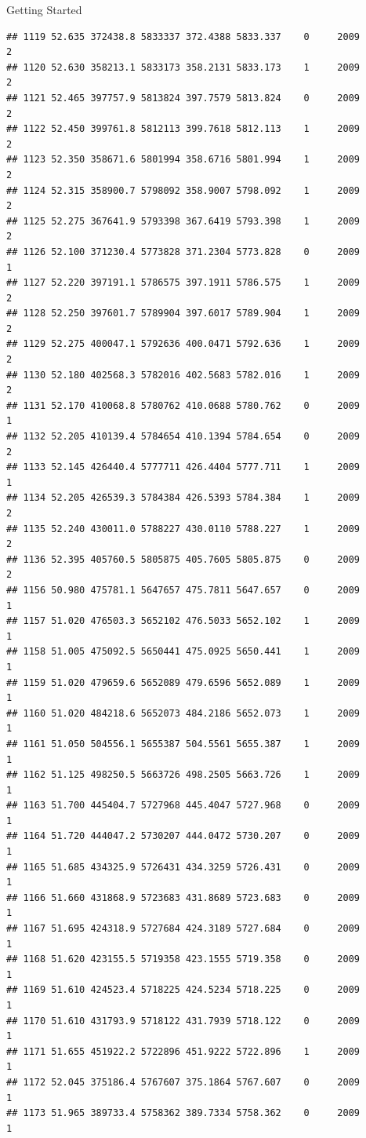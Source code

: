 \documentclass[
  ignorenonframetext,
]{beamer}
\begin{document}
\begin{frame}[fragile]{Getting Started}
\begin{verbatim}
## 1119 52.635 372438.8 5833337 372.4388 5833.337    0     2009        2
## 1120 52.630 358213.1 5833173 358.2131 5833.173    1     2009        2
## 1121 52.465 397757.9 5813824 397.7579 5813.824    0     2009        2
## 1122 52.450 399761.8 5812113 399.7618 5812.113    1     2009        2
## 1123 52.350 358671.6 5801994 358.6716 5801.994    1     2009        2
## 1124 52.315 358900.7 5798092 358.9007 5798.092    1     2009        2
## 1125 52.275 367641.9 5793398 367.6419 5793.398    1     2009        2
## 1126 52.100 371230.4 5773828 371.2304 5773.828    0     2009        1
## 1127 52.220 397191.1 5786575 397.1911 5786.575    1     2009        2
## 1128 52.250 397601.7 5789904 397.6017 5789.904    1     2009        2
## 1129 52.275 400047.1 5792636 400.0471 5792.636    1     2009        2
## 1130 52.180 402568.3 5782016 402.5683 5782.016    1     2009        2
## 1131 52.170 410068.8 5780762 410.0688 5780.762    0     2009        1
## 1132 52.205 410139.4 5784654 410.1394 5784.654    0     2009        2
## 1133 52.145 426440.4 5777711 426.4404 5777.711    1     2009        1
## 1134 52.205 426539.3 5784384 426.5393 5784.384    1     2009        2
## 1135 52.240 430011.0 5788227 430.0110 5788.227    1     2009        2
## 1136 52.395 405760.5 5805875 405.7605 5805.875    0     2009        2
## 1156 50.980 475781.1 5647657 475.7811 5647.657    0     2009        1
## 1157 51.020 476503.3 5652102 476.5033 5652.102    1     2009        1
## 1158 51.005 475092.5 5650441 475.0925 5650.441    1     2009        1
## 1159 51.020 479659.6 5652089 479.6596 5652.089    1     2009        1
## 1160 51.020 484218.6 5652073 484.2186 5652.073    1     2009        1
## 1161 51.050 504556.1 5655387 504.5561 5655.387    1     2009        1
## 1162 51.125 498250.5 5663726 498.2505 5663.726    1     2009        1
## 1163 51.700 445404.7 5727968 445.4047 5727.968    0     2009        1
## 1164 51.720 444047.2 5730207 444.0472 5730.207    0     2009        1
## 1165 51.685 434325.9 5726431 434.3259 5726.431    0     2009        1
## 1166 51.660 431868.9 5723683 431.8689 5723.683    0     2009        1
## 1167 51.695 424318.9 5727684 424.3189 5727.684    0     2009        1
## 1168 51.620 423155.5 5719358 423.1555 5719.358    0     2009        1
## 1169 51.610 424523.4 5718225 424.5234 5718.225    0     2009        1
## 1170 51.610 431793.9 5718122 431.7939 5718.122    0     2009        1
## 1171 51.655 451922.2 5722896 451.9222 5722.896    1     2009        1
## 1172 52.045 375186.4 5767607 375.1864 5767.607    0     2009        1
## 1173 51.965 389733.4 5758362 389.7334 5758.362    0     2009        1

\end{verbatim}
\end{frame}
\end{document}
